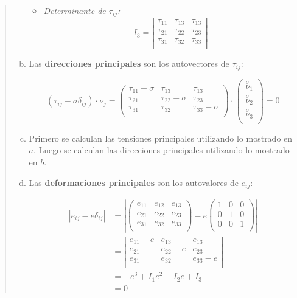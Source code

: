 \documentclass[a4paper,10pt,twoside,final,spanish]{article}
\begin{document}
\begin{quote}
\begin{enumerate}[a.]
\begin{itemize}
\item \textit{Determinante de $\tau_{ij}$: }
\[
I_{3}=
\left|
\begin{matrix}
\tau_{11} & \tau_{13} & \tau_{13} \\
\tau_{21} & \tau_{22} & \tau_{23} \\
\tau_{31} & \tau_{32} & \tau_{33} \\
\end{matrix}
\right|
\]
\end{itemize}

\item 

Las \textbf{direcciones principales} son los autovectores de $\tau_{ij}$:

\[
(\tau_{ij}-\sigma\delta_{ij})\cdot\nu_{j}=
\left(\begin{matrix}
\tau_{11}-\sigma & \tau_{13} & \tau_{13} \\
\tau_{21} & \tau_{22}-\sigma & \tau_{23} \\
\tau_{31} & \tau_{32} & \tau_{33}-\sigma \\
\end{matrix}\right)\cdot
\left(\begin{matrix}
\stackrel \sigma \nu_{1} \\
\stackrel \sigma \nu_{2} \\
\stackrel \sigma \nu_{3} \\
\end{matrix}\right)=0
\]

\item Primero se calculan las tensiones principales utilizando lo mostrado en $a$. Luego se calculan las direcciones principales utilizando lo mostrado en $b$.

\item 

Las \textbf{deformaciones principales} son los autovalores de $e_{ij}$:

\begin{align*}
|e_{ij}-e\delta_{ij}| 
&=
\left|\left(\begin{matrix}
e_{11} & e_{12} & e_{13} \\
e_{21} & e_{22} & e_{23} \\
e_{31} & e_{32} & e_{33} \\
\end{matrix}\right)-e
\left(\begin{matrix}
1 & 0 & 0 \\
0 & 1 & 0 \\
0 & 0 & 1 \\
\end{matrix}\right)\right| \\
&=
\left|\begin{matrix}
e_{11}-e & e_{13} & e_{13} \\
e_{21} & e_{22}-e & e_{23} \\
e_{31} & e_{32} & e_{33}-e \\
\end{matrix}\right| \\
&= 
-e^{3}+I_{1}e^{2}-I_{2}e+I_{3} \\
&=
0
\end{align*}


\end{enumerate}
\end{quote}
\end{document}
